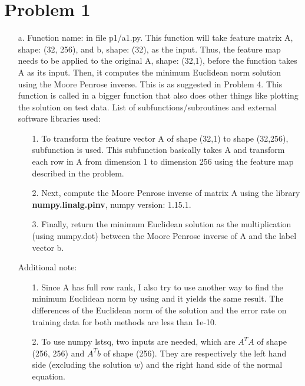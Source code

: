 \documentclass[twoside]{homework}
\begin{document}
\maketitle

\section*{Problem 1}
\begin{itemize}
    \item [a.] Function name:  in file p1/a1.py. This function will take feature matrix A, shape: (32, 256), and b, shape: (32), as the input. Thus, the feature map needs to be applied to the original A, shape: (32,1), before the function takes A as its input. Then, it computes the minimum Euclidean norm solution using the Moore Penrose inverse. This is as suggested in Problem 4. This function is called in a bigger function  that also does other things like plotting the solution on test data. List of subfunctions/subroutines and external software libraries used:
    \begin{itemize}
        \item [1.] To transform the feature vector A of shape (32,1) to shape (32,256), subfunction  is used. This subfunction basically takes A and transform each row in A from dimension 1 to dimension 256 using the feature map described in the problem.
        \item [2.] Next, compute the Moore Penrose inverse of matrix A using the library \textbf{numpy.linalg.pinv}, numpy version: 1.15.1.
        \item [3.] Finally, return the minimum Euclidean solution as the multiplication (using numpy.dot) between the Moore Penrose inverse of A and the label vector b.
    \end{itemize}
    Additional note:
    \begin{itemize}
        \item [1.] Since A has full row rank, I also try to use another way to find the minimum Euclidean norm by using  and it yields the same result. The differences of the Euclidean norm of the solution and the error rate on training data for both methods are less than 1e-10.
        \item [2.] To use numpy lstsq, two inputs are needed, which are $A^TA$ of shape (256, 256) and $A^Tb$ of shape (256). They are respectively the left hand side (excluding the solution $w$) and the right hand side of the normal equation.

\end{itemize}
\end{itemize}
\end{document}
